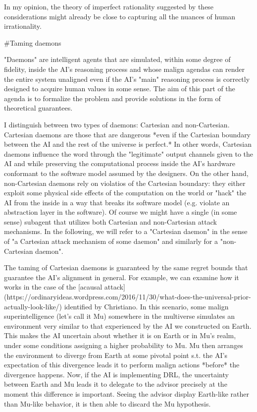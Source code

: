 \documentclass[a4paper]{article}
\begin{document}
In my opinion, the theory of imperfect rationality suggested by these considerations might already be close to capturing all the nuances of human irrationality.

\#Taming daemons

"Daemons" are intelligent agents that are simulated, within some degree of fidelity, inside the AI's reasoning process and whose malign agendas can render the entire system unaligned even if the AI's "main" reasoning process is correctly designed to acquire human values in some sense. The aim of this part of the agenda is to formalize the problem and provide solutions in the form of theoretical guarantees.

I distinguish between two types of daemons: Cartesian and non-Cartesian. Cartesian daemons are those that are dangerous *even if the Cartesian boundary between the AI and the rest of the universe is perfect.* In other words, Cartesian daemons influence the word through the "legitimate" output channels given to the AI and while preserving the computational process inside the AI's hardware conformant to the software model assumed by the designers. On the other hand, non-Cartesian daemons rely on violatios of the Cartesian boundary: they either exploit some physical side effects of the computation on the world or "hack" the AI from the inside in a way that breaks its software model (e.g. violate an abstraction layer in the software). Of course we might have a single (in some sense) subagent that utilizes both Cartesian and non-Cartesian attack mechanisms. In the following, we will refer to a "Cartesian daemon" in the sense of "a Cartesian attack mechanism of some daemon" and similarly for a "non-Cartesian daemon".

The taming of Cartesian daemons is guaranteed by the same regret bounds that guarantee the AI's alignment in general. For example, we can examine how it works in the case of the [acausal attack](https://ordinaryideas.wordpress.com/2016/11/30/what-does-the-universal-prior-actually-look-like/) identified by Christiano. In this scenario, some malign superintelligence (let's call it Mu) somewhere in the multiverse simulates an environment very similar to that experienced by the AI we constructed on Earth. This makes the AI uncertain about whether it is on Earth or in Mu's realm, under some conditions assigning a higher probability to Mu. Mu then arranges the environment to diverge from Earth at some pivotal point s.t. the AI's expectation of this divergence leads it to perform malign actions *before* the divergence happens. Now, if the AI is implementing DRL, the uncertainty between Earth and Mu leads it to delegate to the advisor precisely at the moment this difference is important. Seeing the advisor display Earth-like rather than Mu-like behavior, it is then able to discard the Mu hypothesis.
\end{document}
